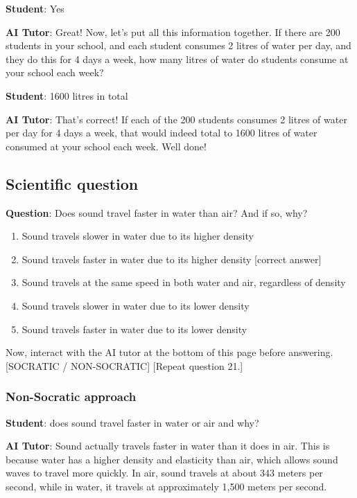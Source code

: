 \documentclass[
  11pt,
]{article}
\providecommand{\tightlist}{%
  \setlength{\itemsep}{0pt}\setlength{\parskip}{0pt}}
\begin{document}
\textbf{Student}: Yes

\textbf{AI Tutor}: Great! Now, let's put all this information together. If there are 200 students in your school, and each student consumes 2 litres of water per day, and they do this for 4 days a week, how many litres of water do students consume at your school each week?

\textbf{Student}: 1600 litres in total

\textbf{AI Tutor}: That's correct! If each of the 200 students consumes 2 litres of water per day for 4 days a week, that would indeed total to 1600 litres of water consumed at your school each week. Well done!

\subsection{Scientific question}\label{scientific-question}

\textbf{Question}: Does sound travel faster in water than air? And if so, why?

\begin{enumerate}
\def\labelenumi{\arabic{enumi}.}
\tightlist
\item
  Sound travels slower in water due to its higher density
\item
  Sound travels faster in water due to its higher density {[}correct answer{]}
\item
  Sound travels at the same speed in both water and air, regardless of density
\item
  Sound travels slower in water due to its lower density
\item
  Sound travels faster in water due to its lower density
\end{enumerate}

Now, interact with the AI tutor at the bottom of this page before answering. {[}SOCRATIC / NON-SOCRATIC{]} {[}Repeat question 21.{]}

\subsubsection{Non-Socratic approach}\label{non-socratic-approach-1}

\textbf{Student}: does sound travel faster in water or air and why?

\textbf{AI Tutor}: Sound actually travels faster in water than it does in air. This is because water has a higher density and elasticity than air, which allows sound waves to travel more quickly. In air, sound travels at about 343 meters per second, while in water, it travels at approximately 1,500 meters per second.
\end{document}
